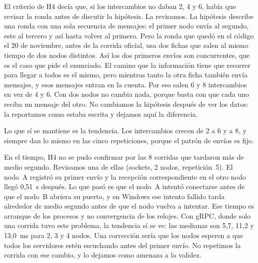 El criterio de H4 decía que, si los intercambios no daban 2, 4 y 6, había que revisar la ronda antes de discutir la hipótesis. La revisamos. La hipótesis describe una ronda con una sola secuencia de mensajes: el primer nodo envía al segundo, este al tercero y así hasta volver al primero. Pero la ronda que quedó en el código el 20 de noviembre, antes de la corrida oficial, usa dos fichas que salen al mismo tiempo de dos nodos distintos. Así los dos primeros envíos son concurrentes, que es el caso que pide el enunciado. El camino que la información tiene que recorrer para llegar a todos es el mismo, pero mientras tanto la otra ficha también envía mensajes, y esos mensajes entran en la cuenta. Por eso salen 6 y 8 intercambios en vez de 4 y 6. Con dos nodos no cambia nada, porque basta con que cada uno reciba un mensaje del otro. No cambiamos la hipótesis después de ver los datos: la reportamos como estaba escrita y dejamos aquí la diferencia.

Lo que sí se mantiene es la tendencia. Los intercambios crecen de 2 a 6 y a 8, y siempre dan lo mismo en las cinco repeticiones, porque el patrón de envíos es fijo.

En el tiempo, H4 no se pudo confirmar por las 8 corridas que tardaron más de medio segundo. Revisamos una de ellas (sockets, 2 nodos, repetición~5). El nodo~A registró su primer envío y la recepción correspondiente en el otro nodo llegó 0,51~s después. Lo que pasó es que el nodo~A intentó conectarse antes de que el nodo~B abriera su puerto, y en Windows ese intento fallido tarda alrededor de medio segundo antes de que el nodo vuelva a intentar. Ese tiempo es arranque de los procesos y no convergencia de los relojes. Con gRPC, donde solo una corrida tuvo este problema, la tendencia sí se ve: las medianas son 5,7, 11,2 y 13,0~ms para 2, 3 y 4 nodos. Una corrección sería que los nodos esperen a que todos los servidores estén escuchando antes del primer envío. No repetimos la corrida con ese cambio, y lo dejamos como amenaza a la validez.
